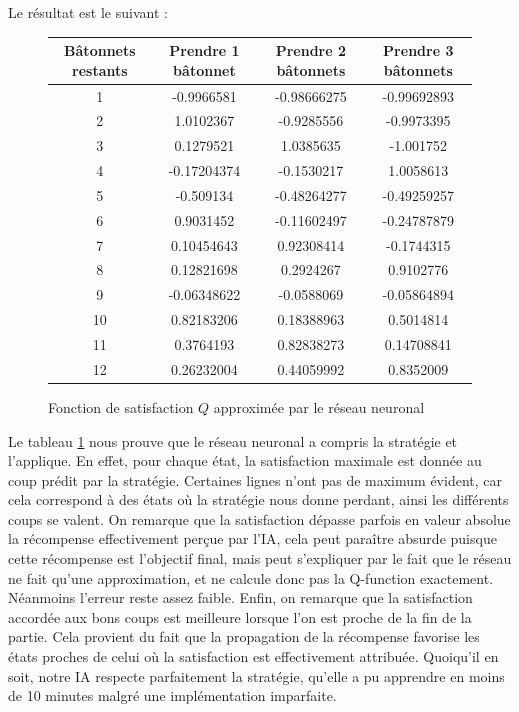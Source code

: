 Le résultat est le suivant :

\begin{figure}[h]
\centering
\begin{tabular}{|c|c|c|c|}
\hline
Bâtonnets restants & Prendre 1 bâtonnet & Prendre 2 bâtonnets & Prendre 3 bâtonnets\\
\hline
1 & -0.9966581 & -0.98666275 & -0.99692893\\
\hline
2 & \cellcolor{green} 1.0102367 & -0.9285556 & -0.9973395\\
\hline
3 & 0.1279521 & \cellcolor{green} 1.0385635 & -1.001752\\
\hline
4 & -0.17204374 & -0.1530217 & \cellcolor{green} 1.0058613\\
\hline
5 & -0.509134 & -0.48264277 & -0.49259257\\
\hline
6 & \cellcolor{green} 0.9031452 & -0.11602497 & -0.24787879\\
\hline
7 & 0.10454643 & \cellcolor{green} 0.92308414 & -0.1744315\\
\hline
8 & 0.12821698 & 0.2924267 & \cellcolor{green} 0.9102776\\
\hline
9 & -0.06348622 & -0.0588069 & -0.05864894\\
\hline
10 & \cellcolor{green} 0.82183206 & 0.18388963 & 0.5014814\\
\hline
11 & 0.3764193 & \cellcolor{green} 0.82838273 & 0.14708841\\
\hline
12 & 0.26232004 & 0.44059992 & \cellcolor{green} 0.8352009\\
\hline
\end{tabular}
\caption{Fonction de satisfaction $Q$ approximée par le réseau neuronal}
\label{tab:Qfunction}
\end{figure}

Le tableau \ref{tab:Qfunction} nous prouve que le réseau neuronal a compris la stratégie et l'applique. En effet, pour chaque état, la satisfaction maximale est donnée
au coup prédit par la stratégie. Certaines lignes n'ont pas de maximum évident, car cela correspond à des états où la stratégie nous donne perdant, ainsi les différents
coups se valent. On remarque que la satisfaction dépasse parfois en valeur absolue la récompense effectivement perçue par l'IA, cela peut paraître absurde puisque cette 
récompense est l'objectif final, mais peut s'expliquer par le fait que le réseau ne fait qu'une approximation, et ne calcule donc pas la Q-function exactement.
Néanmoins l'erreur reste assez faible. Enfin, on remarque que la satisfaction accordée aux bons coups est meilleure lorsque l'on est proche de la fin de la partie.
Cela provient du fait que la propagation de la récompense favorise les états proches de celui où la satisfaction est effectivement attribuée. Quoiqu'il en soit, notre IA
respecte parfaitement la stratégie, qu'elle a pu apprendre en moins de 10 minutes malgré une implémentation imparfaite.


